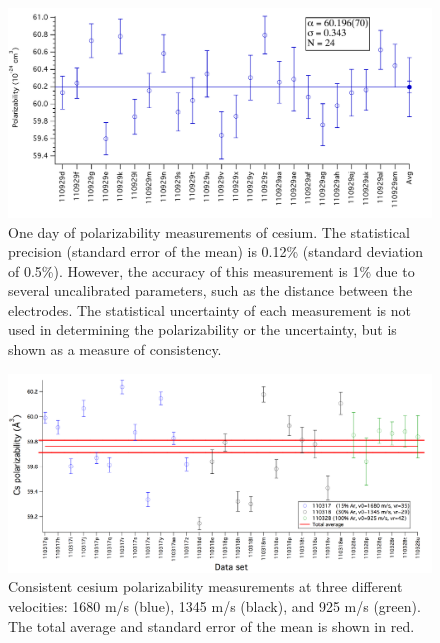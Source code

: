 \begin{figure}
\includegraphics[width=1\textwidth]{Figures/csPol110929.pdf}
\caption[One day of polarizability measurements of Cs.]{\label{csPolNew}One day of polarizability measurements of cesium. The statistical precision (standard error of the mean) is 0.12\% (standard deviation of 0.5\%). However, the accuracy of this measurement is 1\% due to several uncalibrated parameters, such as the distance between the electrodes. The statistical uncertainty of each measurement is not used in determining the polarizability or the uncertainty, but is shown as a measure of consistency.}
\end{figure}


\begin{figure}
\includegraphics[width=1\textwidth]{Figures/csPolDifferentVels.pdf}
\caption[Consistent Cs polarizability measurements of at different velocities]{\label{csPolVelDiff}Consistent cesium polarizability measurements at three different velocities: 1680 m/s (blue), 1345 m/s (black), and 925 m/s (green). The total average and standard error of the mean is shown in red.}
\end{figure}



